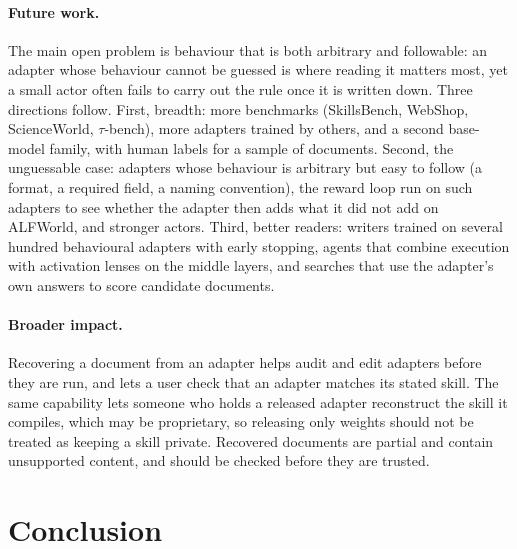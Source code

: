 \documentclass[11pt]{article}
\begin{document}
\paragraph{Future work.} The main open problem is behaviour that is both arbitrary and followable: an adapter whose behaviour cannot be
guessed is where reading it matters most, yet a small actor often fails to carry out the rule once it is written down. Three directions follow. First, breadth: more benchmarks (SkillsBench, WebShop, ScienceWorld, $\tau$-bench), more
adapters trained by others, and a second base-model family, with human labels for a sample of documents. Second, the unguessable case: adapters whose
behaviour is arbitrary but easy to follow (a format, a required field, a naming convention), the reward loop run on such adapters to see whether
the adapter then adds what it did not add on ALFWorld, and stronger actors. Third, better readers: writers trained on several hundred behavioural
adapters with early stopping, agents that combine execution with activation lenses on the middle layers, and searches that use the adapter's own
answers to score candidate documents.

\paragraph{Broader impact.} Recovering a document from an adapter helps audit and edit adapters before they are run, and lets a user check that an adapter
matches its stated skill. The same capability lets someone who holds a released adapter reconstruct the skill it compiles, which may be proprietary,
so releasing only weights should not be treated as keeping a skill private. Recovered documents are partial and contain unsupported content, and
should be checked before they are trusted.

\section{Conclusion}
\end{document}
